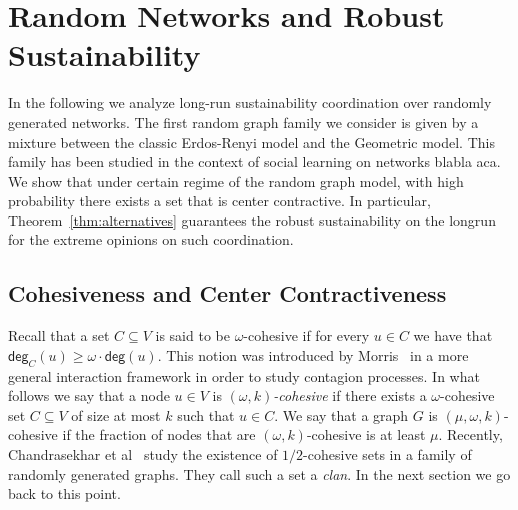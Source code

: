 \documentclass[letterpaper,11pt]{article}
\newcommand{\degsf}{\mathsf{deg}}
\begin{document}
\section{Random Networks and Robust Sustainability}
\label{sec:random}

In the following we analyze long-run sustainability coordination over randomly generated networks.
The first random graph family we consider is given by a mixture between the classic Erdos-Renyi model and the Geometric model. 
This family has been studied in the context of social learning on networks {\color{red} blabla aca}.
We show that under certain regime of the random graph model, with high probability there exists a set that is center contractive.
In particular, Theorem~\ref{thm:alternatives} guarantees the robust sustainability on the longrun for the extreme opinions on such coordination.

\subsection{Cohesiveness and Center Contractiveness}

Recall that a set $C\subseteq V$ is said to be $\omega$-cohesive if for every $u\in C$ we have that $\degsf_C(u)\ge \omega\cdot \degsf(u)$.
This notion was introduced by Morris~\cite{morris} in a more general interaction framework in order to study contagion processes.
In what follows we say that a node $u\in V$ is {\it $(\omega,k)$-cohesive} if there exists a $\omega$-cohesive set $C\subseteq V$ of size at most $k$ such that $u\in C$.
We say that a graph $G$ is $(\mu,\omega,k)$-cohesive if the fraction of nodes that are $(\omega,k)$-cohesive is at least $\mu$.
Recently, Chandrasekhar et al~\cite{} study the existence of $1/2$-cohesive sets in a family of randomly generated graphs. 
They call such a set a {\it clan}. 
In the next section we go back to this point.
\end{document}
